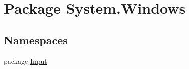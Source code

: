 \hypertarget{namespace_system_1_1_windows}{\section{Package System.\-Windows}
\label{namespace_system_1_1_windows}
}
\subsection*{Namespaces}
\begin{DoxyCompactItemize}
\item 
package \hyperlink{namespace_system_1_1_windows_1_1_input}{Input}
\end{DoxyCompactItemize}
